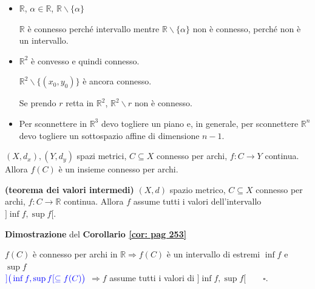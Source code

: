 \begin{exbar}
	\begin{itemize}
		\item $\mathbb{R}$, $\alpha \in \mathbb{R}$, $\mathbb{R} \backslash \{\alpha\}$
		
		$\mathbb{R}$ è connesso perché intervallo mentre $\mathbb{R} \backslash \{\alpha\}$ non è connesso, perché non è un intervallo.
		
		\item $\mathbb{R}^2$ è convesso e quindi connesso.
		
		$\mathbb{R}^2\backslash \{(x_0,y_0)\}$ è ancora connesso.
		
		\segnaposto
		
		Se prendo $r$ retta in $\mathbb{R}^2$, $\mathbb{R}^2\backslash r$ non è connesso.
		
		\segnaposto
		
		\item Per sconnettere in $\mathbb{R}^3$ devo togliere un piano e, in generale, per sconnettere $\mathbb{R}^n$ devo togliere un sottospazio affine di dimensione $n-1$.
	\end{itemize}
\end{exbar}


\begin{theorem}
	\label{th: pag 252}
	$(X,d_x),(Y,d_y)$ spazi metrici, $C \subseteq X$ connesso per archi, $f: C \rightarrow Y$ continua. Allora $f(C)$ è un insieme connesso per archi.
\end{theorem}


\begin{corollary} \textbf{(teorema dei valori intermedi)}
	\label{cor: pag 253}
	$(X,d)$ spazio metrico, $C \subseteq X$ connesso per archi, $f:C \rightarrow \mathbb{R}$ continua. Allora $f$ assume tutti i valori dell'intervallo $]\inf f, \sup f[$.
\end{corollary}


\begin{dembar}
	\textbf{Dimostrazione} del \textbf{Corollario \ref{cor: pag 253}}
	
	$f(C)$ è connesso per archi in $\mathbb{R} \Rightarrow f(C)$ è un intervallo di estremi $\inf f$ e $\sup f$ \\%
	${\color{blue} ] \big( \inf f, \sup f[ \subseteq f(C) \big)}$ $\Rightarrow f$ assume tutti i valori di $]\inf f, \sup f[ \qquad\square$.
\end{dembar}
	

